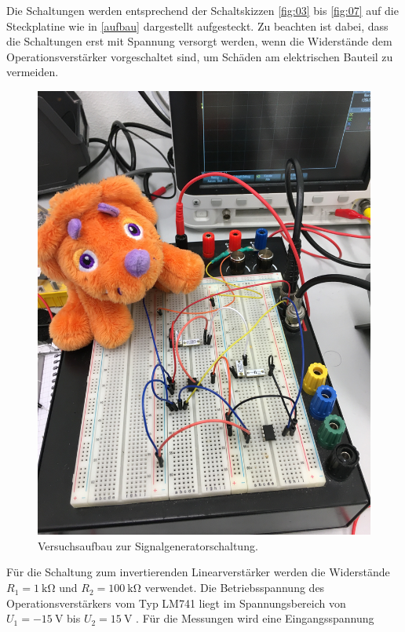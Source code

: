 \noindent Die Schaltungen werden entsprechend der Schaltskizzen \ref{fig:03} bis
\ref{fig:07} auf die Steckplatine wie in \autoref{aufbau} dargestellt
aufgesteckt. Zu beachten ist dabei, dass die Schaltungen erst mit Spannung
versorgt werden, wenn die Widerstände dem Operationsverstärker vorgeschaltet
sind, um Schäden am elektrischen Bauteil zu vermeiden. \\
\FloatBarrier
\begin{figure}
  \centering
  \includegraphics[scale=0.07]{ressources/aufbau.JPG}
  \caption{Versuchsaufbau zur Signalgeneratorschaltung.}
  \label{aufbau}
\end{figure}
\FloatBarrier
\noindent Für die Schaltung zum invertierenden Linearverstärker werden die
Widerstände $R_1 = \SI{1}{\kilo\ohm}$ und $R_2 = \SI{100}{\kilo\ohm}$
verwendet. Die Betriebsspannung des Operationsverstärkers vom Typ LM741
liegt im Spannungsbereich von $U_1 = -\SI{15}{\volt}$ bis $U_2 = \SI{15}{\volt}$
\cite{datenblatt}. Für die Messungen wird eine Eingangsspannung
